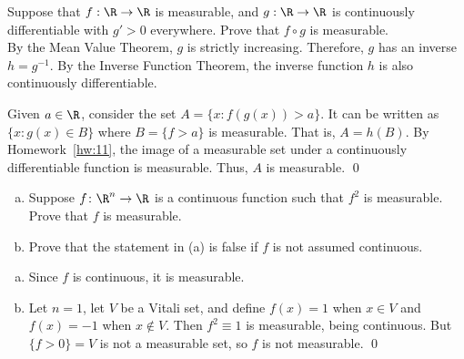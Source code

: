 \begin{hwsol}
Suppose that $f: \R \to \R$ is measurable, and $g: \R \to \R$ is continuously differentiable with $g' > 0$ everywhere. Prove that $f \circ g$ is measurable. \\

\pf By the Mean Value Theorem, $g$ is strictly increasing. Therefore, $g$ has an inverse $h= g^{-1}$. By the Inverse Function Theorem, the inverse function $h$ is also continuously differentiable. 

Given $a \in \R$, consider the set $A= \{ x \colon f(g(x)) > a \}$. It can be written as $\{ x \colon g(x) \in B \}$ where $B= \{ f>a \}$ is measurable. That is, $A= h(B)$. By Homework~\ref{hw:11}, the image of a measurable set under a continuously differentiable function is measurable. Thus, $A$ is measurable. \qed \\
\end{hwsol}


\begin{hwsol} \hfill
\begin{enumerate}[(a)]
\item Suppose $f\colon \R^n\to\R$ is a continuous function such that $f^2$ is measurable. Prove that $f$ is measurable.
\item Prove that the statement in (a) is false if $f$ is not assumed continuous. \\
\end{enumerate}

\pf \hfill
\begin{enumerate}[(a)]
\item Since $f$ is continuous, it is measurable. 

\item Let $n=1$, let $V$ be a Vitali set, and define $f(x)= 1$ when $x\in V$ and $f(x)= -1$ when $x \notin V$. Then $f^2 \equiv 1$ is measurable, being continuous. But $\{ f > 0 \}= V$ is not a measurable set, so $f$ is not measurable. \qed \\
\end{enumerate}
\end{hwsol}


